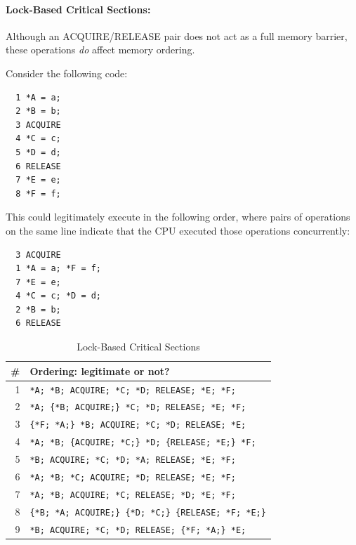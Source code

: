 \paragraph{Lock-Based Critical Sections:}
Although an ACQUIRE\-/RELEASE pair does not act as a full memory barrier,
these operations \emph{do} affect memory ordering.

Consider the following code:

\vspace{5pt}
\begin{minipage}[t]{\columnwidth}
\scriptsize
\begin{verbatim}
  1 *A = a;
  2 *B = b;
  3 ACQUIRE
  4 *C = c;
  5 *D = d;
  6 RELEASE
  7 *E = e;
  8 *F = f;
\end{verbatim}
\end{minipage}
\vspace{5pt}

This could legitimately execute in the following order, where pairs
of operations on the same line indicate that the CPU executed those
operations concurrently:

\vspace{5pt}
\begin{minipage}[t]{\columnwidth}
\scriptsize
\begin{verbatim}
  3 ACQUIRE
  1 *A = a; *F = f;
  7 *E = e;
  4 *C = c; *D = d;
  2 *B = b;
  6 RELEASE
\end{verbatim}
\end{minipage}
\vspace{5pt}

\begin{table}[htbp]
\scriptsize\centering
\begin{tabular}{r|l}
  \# & Ordering: legitimate or not? \\
  \hline
  \hline
  1 & \verb|*A; *B; ACQUIRE; *C; *D; RELEASE; *E; *F;| \\
  \hline
  2 & \verb|*A; {*B; ACQUIRE;} *C; *D; RELEASE; *E; *F;| \\
  \hline
  3 & \verb|{*F; *A;} *B; ACQUIRE; *C; *D; RELEASE; *E;| \\
  \hline
  4 & \verb|*A; *B; {ACQUIRE; *C;} *D; {RELEASE; *E;} *F;| \\
  \hline
  5 & \verb|*B; ACQUIRE; *C; *D; *A; RELEASE; *E; *F;| \\
  \hline
  6 & \verb|*A; *B; *C; ACQUIRE; *D; RELEASE; *E; *F;| \\
  \hline
  7 & \verb|*A; *B; ACQUIRE; *C; RELEASE; *D; *E; *F;| \\
  \hline
  8 & \verb|{*B; *A; ACQUIRE;} {*D; *C;} {RELEASE; *F; *E;}| \\
  \hline
  9 & \verb|*B; ACQUIRE; *C; *D; RELEASE; {*F; *A;} *E;| \\
\end{tabular}
\caption{Lock-Based Critical Sections}
\label{tab:advsync:Lock-Based Critical Sections}
\end{table}

